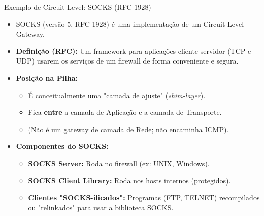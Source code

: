 \begin{frame}{Exemplo de Circuit-Level: SOCKS (RFC 1928)}
    \begin{itemize}
        \item SOCKS (versão 5, RFC 1928) é uma implementação de um Circuit-Level Gateway.

        \item \textbf{Definição (RFC):} Um framework para aplicações cliente-servidor (TCP e UDP) usarem os serviços de um firewall de forma conveniente e segura.

        \item \textbf{Posição na Pilha:}
              \begin{itemize}
                  \item É conceitualmente uma "camada de ajuste" (\textit{shim-layer}).
                  \item Fica \textbf{entre} a camada de Aplicação e a camada de Transporte.
                  \item (Não é um gateway de camada de Rede; não encaminha ICMP).
              \end{itemize}

        \item \textbf{Componentes do SOCKS:}
              \begin{itemize}
                  \item \textbf{SOCKS Server:} Roda no firewall (ex: UNIX, Windows).
                  \item \textbf{SOCKS Client Library:} Roda nos hosts internos (protegidos).
                  \item \textbf{Clientes "SOCKS-ificados":} Programas (FTP, TELNET) recompilados ou "relinkados" para usar a biblioteca SOCKS.
              \end{itemize}
    \end{itemize}
\end{frame}

